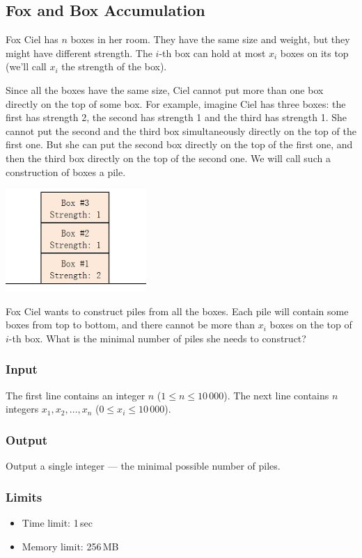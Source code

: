 \subsection{Fox and Box Accumulation}

Fox Ciel has $n$ boxes in her room.
They have the same size and weight, but they might have different strength.
The $i$-th box can hold at most $x_i$ boxes on its top
(we'll call $x_i$ the strength of the box).

Since all the boxes have the same size,
Ciel cannot put more than one box directly on the top of some box.
For example, imagine Ciel has three boxes:
the first has strength 2, the second has strength 1 and
the third has strength 1.
She cannot put the second and the third box simultaneously
directly on the top of the first one.
But she can put the second box directly on the top of the first one,
and then the third box directly on the top of the second one.
We will call such a construction of boxes a pile.
\begin{center}
\includegraphics[width=0.4\textwidth]{./img/boxes}
\end{center}
Fox Ciel wants to construct piles from all the boxes.
Each pile will contain some boxes from top to bottom,
and there cannot be more than $x_i$ boxes on the top of $i$-th box.
What is the minimal number of piles she needs to construct?

\subsubsection*{Input}
The first line contains an integer $n$ ($1\leq n\leq 10\,000$).
The next line contains $n$ integers $x_1,x_2,\ldots,x_n$ ($0 \leq x_i \leq 10\,000$).

\subsubsection*{Output}
Output a single integer --- the minimal possible number of piles.

\subsubsection*{Limits}
\begin{itemize}
    \item Time limit: 1\,sec
    \item Memory limit: 256\,MB
\end{itemize}

